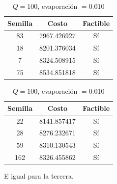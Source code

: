 \documentclass{article}
\begin{document}
    \begin{table}[H]
      \begin{minipage}{0.5\linewidth}
        \centering
        \caption{$Q=10$, evaporación $= 0.010$}
        \begin{tabular}{c c c}
          \hline
          Semilla & Costo & Factible   \\
          \hline
          83      & 7967.426927  & Sí  \\
          18      & 8201.376034  & Sí  \\
          7       & 8324.508915  & Sí  \\
          75      & 8534.851818  & Sí  \\
        \end{tabular}
      \end{minipage}
      \begin{minipage}{0.5\linewidth}
        \centering
        \caption{$Q=100$, evaporación $= 0.010$}
        \begin{tabular}{c c c}
          \hline
          Semilla & Costo & Factible   \\
          \hline
          22      & 8141.857417  & Sí  \\
          28      & 8276.232671  & Sí  \\
          59      & 8310.130543  & Sí  \\
          162     & 8326.455862  & Sí  \\
        \end{tabular}
      \end{minipage}
    \end{table}

    E igual para la tercera.
\end{document}
